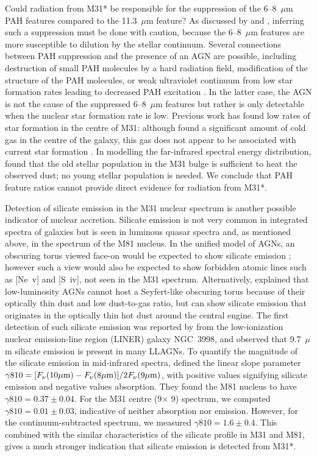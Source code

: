 Could radiation from M31* be responsible for the suppression of the  6--8~$\mu$m PAH features compared
to the 11.3~$\mu$m feature?
As discussed by  \citet{Smith:2007lr} and \citet{Smith2010}, inferring such a suppression must be done with caution, 
because the 6--8~$\mu$m features are more susceptible to dilution by the stellar continuum. 
Several connections between PAH suppression and the presence of an AGN are possible, including destruction of small PAH molecules by a hard radiation field, modification of the structure of the PAH molecules, or weak ultraviolet continuum from low star formation rates 
leading to decreased PAH excitation \citep{Smith:2007lr, Diamond2010}.  In the latter case, the AGN is not the cause of the suppressed  6--8~$\mu$m features but rather is only detectable when the nuclear star formation rate is low.
Previous work has found low rates of star formation in the centre of M31: although \citet{Melchior2013} found a significant 
amount of cold gas in the centre of the galaxy, this gas does not appear to be associated with current star formation \citep[see also][]{Li09}.
In modelling the far-infrared spectral energy distribution, \cite{Groves2012} found that  
the old stellar population in the M31 bulge is sufficient to heat the observed dust; no young stellar population is needed. We conclude that PAH feature ratios cannot provide direct evidence for radiation from M31*.


Detection of silicate emission in the M31 nuclear spectrum is another possible indicator of nuclear accretion.
Silicate emission is not very common in integrated spectra of galaxies \citep{Spoon2007} but is seen in luminous 
quasar spectra \citep[e.g.][]{Hill14} and, as mentioned above, in the spectrum of the M81 nucleus. 
In the unified model of AGNs, an obscuring torus viewed face-on would be expected to show silicate emission
\citep{AGNtypes1995, AGNref}; however such a view would also be expected to show forbidden atomic lines such as [Ne~{\sc v}] and [S~{\sc iv}],
not seen in the M31 spectrum. Alternatively, \citet{Mason2012} explained that low-luminosity AGNs cannot 
host a Seyfert-like obscuring torus because of their optically thin dust and low dust-to-gas ratio, but can show
silicate emission that originates in the optically thin hot dust around the central engine.  The first detection of such silicate emission was 
reported by \citet{Sturm2005} from the low-ionization nuclear emission-line region (LINER) galaxy NGC~3998, and 
\citet{Mason2012}  observed that  9.7~$\mu$m silicate emission is present in many LLAGNs. 
To quantify the magnitude of the silicate emission in mid-infrared spectra, \citet{Smith2010} defined
the linear slope parameter $\gamma810 =[F_{\nu}(10\mu{\rm m}) -F_{\nu}(8\mu{\rm m})]/2F_{\nu}(9\mu{\rm m})$,
with positive values signifying silicate emission and negative values absorption. They found the M81 nucleus to have
$\gamma810=0.37\pm0.04$. For the M31 centre (9\arcsec $\times$ 9\arcsec) spectrum, we computed  $\gamma810 =0.01\pm 0.03$,
indicative of neither absorption nor emission. However, for the continuum-subtracted spectrum, we measured   $\gamma810 =1.6\pm 0.4$. This combined with the similar characteristics of the silicate profile in M31 and M81, gives a much stronger indication that silicate emission is detected from M31*.

